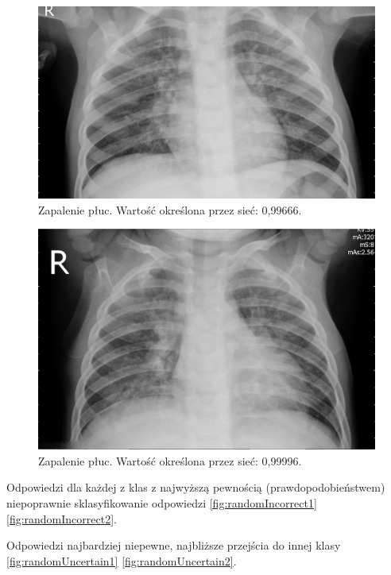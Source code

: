 \documentclass[12pt,a4paper,twoside,titlepage,openright]{book}
\begin{document}
\begin{itemize}
\begin{itemize}
\begin{figure}[ht]
	\centering
			\includegraphics[resolution=100, scale=0.3]{randomCertain3.png}
		\caption{Zapalenie płuc. Wartość określona przez sieć: 0,99666.}
				\label{fig:randomCertain3}
\end{figure}

\begin{figure}[ht]
	\centering
			\includegraphics[resolution=100, scale=0.3]{randomCertain4.png}
		\caption{Zapalenie płuc. Wartość określona przez sieć: 0,99996.}
				\label{fig:randomCertain4}
\end{figure}


Odpowiedzi dla każdej z klas z najwyższą pewnością (prawdopodobieństwem) niepoprawnie sklasyfikowanie odpowiedzi \ref{fig:randomIncorrect1} \ref{fig:randomIncorrect2}. 

Odpowiedzi najbardziej niepewne, najbliższe przejścia do innej klasy \ref{fig:randomUncertain1} \ref{fig:randomUncertain2}.


\end{itemize}
\end{itemize}
\end{document}
